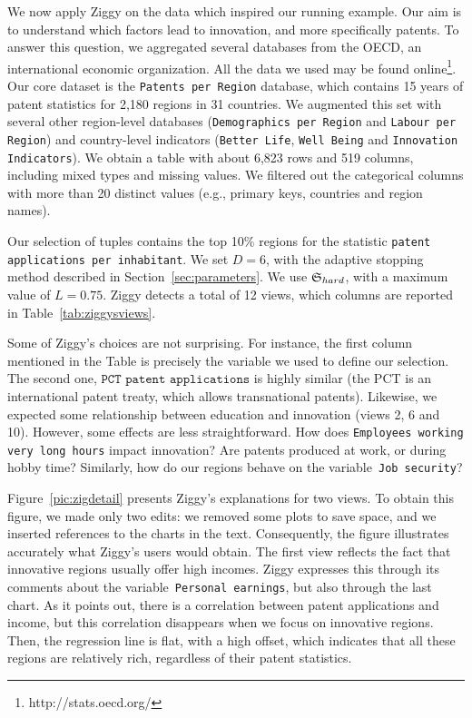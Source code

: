 We now apply Ziggy on the data which inspired our running example.
Our aim is to understand which factors lead to innovation, and more
specifically patents.  To answer this question, we aggregated several
databases from the OECD, an international economic organization. All the data
we used may be found online\footnote{http://stats.oecd.org/}. Our core dataset
is the \texttt{Patents per Region} database, which contains 15 years of patent
statistics for 2,180 regions in 31 countries. We augmented this set with
several other region-level databases (\texttt{Demo\-gra\-phics per Region} and
\texttt{Labour per Region}) and country-level indicators (\texttt{Better Life},
\texttt{Well Being} and \texttt{Innovation Indicators}).  We obtain a table
with about 6,823 rows and 519 columns, including mixed types and missing
values. We filtered out the categorical columns with more than 20 distinct
values (e.g., primary keys, countries and region names). 

Our selection of tuples contains the top 10\% regions for the statistic
\texttt{patent applications per inhabitant}. We set $D=6$, with the
adaptive stopping method described in Section~\ref{sec:parameters}. We use
$\mathfrak{S}_{hard}$, with a maximum value of $L=0.75$.  Ziggy detects a total of 12
views, which columns are reported in Table~\ref{tab:ziggysviews}.

Some of Ziggy's choices are not surprising. For instance, the first
column mentioned in the Table is precisely the variable we used to define our
selection. The second one, $\texttt{PCT patent applications}$ is highly similar
(the PCT is an international patent treaty, which allows transnational
pa\-tents). Likewise, we expected some relationship between education and
innovation (views 2, 6 and 10). However, some effects are less straightforward.
How does \texttt{Employees working very long\- hours} impact innovation? Are
patents produced at work, or during hobby time? Similarly, how do our
regions behave on the variable~\texttt{Job security}?

Figure~\ref{pic:zigdetail} presents Ziggy's explanations for two views. To
obtain this figure, we made only two edits: we removed some plots to save
space, and we inserted references to the charts in the text. Consequently, the
figure illustrates accurately what Ziggy's users would obtain. The first view
reflects the fact that innovative regions usually offer high incomes. Ziggy
expresses this through its comments about the
variable~\texttt{Personal earnings}, but also through the last chart. As it
points out, there is a correlation between patent applications and income, but
this correlation disappears when we focus on innovative regions. Then, the
regression line is flat, with a high offset, which indicates that all these
regions are relatively rich, regardless of their patent statistics.

